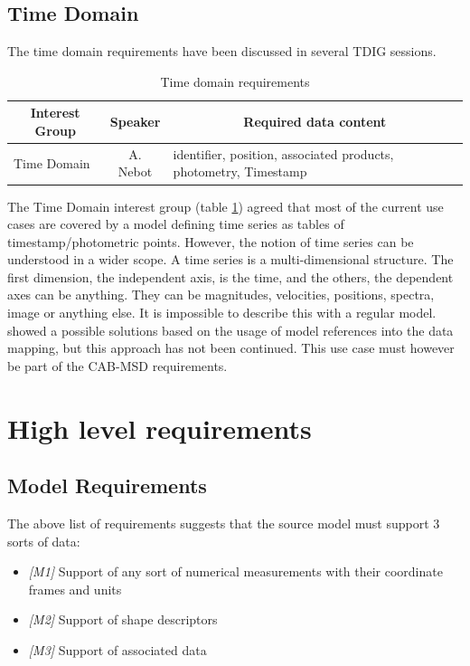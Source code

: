 \documentclass[11pt,a4paper]{ivoa}
\begin{document}
\subsection{Time Domain}
The time domain requirements have been discussed in several TDIG sessions. 
\begin{table}[H]
\begin{tabular}{|p{7em}|c|p{17em}|}
  \hline
        \multicolumn{1}{|c}{\bfseries Interest Group} & \multicolumn{1}{|c}{\bfseries Speaker} & \multicolumn{1}{|c|}{\bfseries Required data content}\\
  \hline
  Time Domain & A. Nebot & 
identifier, position, associated products, 
photometry, Timestamp
 \\
\hline
\end{tabular}
\caption{Time domain requirements}
\label{table:ttime}
\end{table}

The Time Domain interest  group (table \ref{table:ttime}) agreed that most of the current use cases are covered by a model defining time series as tables of timestamp/photometric points. However, the notion of time series can be understood in a wider scope. A time series is a multi-dimensional structure. The first dimension, the independent axis, is the time, and the others, the dependent axes can be anything. They can be magnitudes, velocities, positions, spectra, image or anything else.  It is impossible to describe this with a regular model. \cite{talk:lmanything}  showed  a possible solutions based on the usage of model references into the data mapping, but this approach has not been continued. This use case must however be part of the CAB-MSD requirements. 

\section{High level requirements}

\subsection{Model Requirements}
The above list of requirements suggests that the source model must support 3 sorts of data:

\begin{itemize}
    \item \textit{[M1]} Support of any sort of numerical measurements with their coordinate frames and units
    \item \textit{[M2]} Support of shape descriptors
    \item \textit{[M3]} Support of associated data
\end{itemize}
\end{document}
